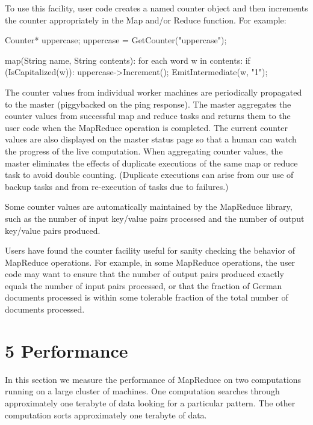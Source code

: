 \documentclass[
]{article}
\newenvironment{Shaded}{}{}
\newcommand{\NormalTok}[1]{#1}
\begin{document}
To use this facility, user code creates a named counter object and then
increments the counter appropriately in the Map and/or Reduce function.
For example:

\begin{Shaded}
\begin{Highlighting}[]
\NormalTok{Counter* uppercase;}
\NormalTok{uppercase = GetCounter("uppercase");}

\NormalTok{map(String name, String contents):}
\NormalTok{    for each word w in contents:}
\NormalTok{    if (IsCapitalized(w)):}
\NormalTok{    uppercase{-}\textgreater{}Increment();}
\NormalTok{    EmitIntermediate(w, "1"); }
\end{Highlighting}
\end{Shaded}

The counter values from individual worker machines are periodically
propagated to the master (piggybacked on the ping response). The master
aggregates the counter values from successful map and reduce tasks and
returns them to the user code when the MapReduce operation is completed.
The current counter values are also displayed on the master status page
so that a human can watch the progress of the live computation. When
aggregating counter values, the master eliminates the effects of
duplicate executions of the same map or reduce task to avoid double
counting. (Duplicate executions can arise from our use of backup tasks
and from re-execution of tasks due to failures.)

Some counter values are automatically maintained by the MapReduce
library, such as the number of input key/value pairs processed and the
number of output key/value pairs produced.

Users have found the counter facility useful for sanity checking the
behavior of MapReduce operations. For example, in some MapReduce
operations, the user code may want to ensure that the number of output
pairs produced exactly equals the number of input pairs processed, or
that the fraction of German documents processed is within some tolerable
fraction of the total number of documents processed.

\section{5 Performance}\label{performance}

In this section we measure the performance of MapReduce on two
computations running on a large cluster of machines. One computation
searches through approximately one terabyte of data looking for a
particular pattern. The other computation sorts approximately one
terabyte of data.
\end{document}
